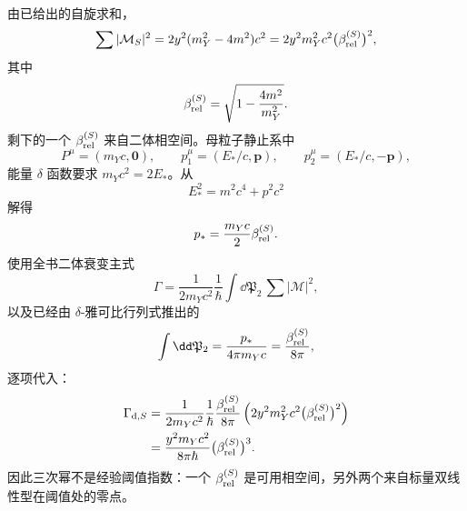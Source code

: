 \begin{exbox}[标量 Yukawa 衰变]
由已给出的自旋求和，
\begin{equation*}
\sum|\mathcal M_S|^2
=2y^2(m_Y^2-4m^2)c^2
=2y^2m_Y^2c^2\bigl(\beta_{\rm rel}^{(S)}\bigr)^2,
\end{equation*}
其中
\begin{equation*}
\beta_{\rm rel}^{(S)}=\sqrt{1-\frac{4m^2}{m_Y^2}}.
\end{equation*}
剩下的一个 $\beta_{\rm rel}^{(S)}$ 来自二体相空间。母粒子静止系中
\begin{equation*}
P^\mu=(m_Yc,\mathbf0),
\qquad
p_1^\mu=(E_*/c,\mathbf p),
\qquad
p_2^\mu=(E_*/c,-\mathbf p),
\end{equation*}
能量 \(\delta\) 函数要求 $m_Yc^2=2E_*$。从
\begin{equation*}
E_*^2=m^2c^4+p^2c^2
\end{equation*}
解得
\begin{equation*}
p_*=\frac{m_Yc}{2}\beta_{\rm rel}^{(S)}.
\end{equation*}
使用全书二体衰变主式
\begin{equation*}
\Gamma
=\frac{1}{2m_Yc^2}\frac{1}{\hbar}
\int\dd\mathfrak P_2\,\sum|\mathcal M|^2,
\end{equation*}
以及已经由 $\delta$-雅可比行列式推出的
\begin{equation*}
\int\dd\mathfrak P_2
=\frac{p_*}{4\pi m_Yc}
=\frac{\beta_{\rm rel}^{(S)}}{8\pi},
\end{equation*}
逐项代入：
\begin{align*}
\Gamma_{{\rm d},S}
&=\frac{1}{2m_Yc^2}\frac1\hbar
\frac{\beta_{\rm rel}^{(S)}}{8\pi}
\left(2y^2m_Y^2c^2\bigl(\beta_{\rm rel}^{(S)}\bigr)^2\right)\\
&=\frac{y^2m_Yc^2}{8\pi\hbar}\bigl(\beta_{\rm rel}^{(S)}\bigr)^3.
\end{align*}
因此三次幂不是经验阈值指数：一个 $\beta_{\rm rel}^{(S)}$ 是可用相空间，另外两个来自标量双线性型在阈值处的零点。
\end{exbox}

